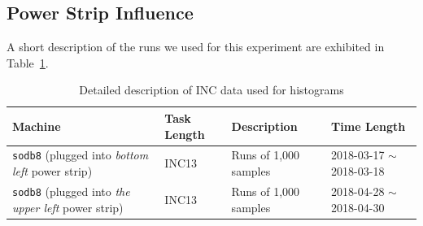 \newpage
\clearpage
\subsection{Power Strip Influence~\label{sec:sodb8}} 

A short description of the runs we used for this experiment are exhibited in Table~\ref{tab:exp_notes4}.

\begin{table}[h]
\begin{center}
\begin{tabular}{|p{4cm}|p{3cm}|p{4cm}|p{4cm}|} \hline
Machine & Task Length & Description & Time Length\\ \hline
{\tt sodb8}  (plugged into {\em bottom left} power strip) &  INC13 & Runs of 1,000 samples & 2018-03-17 $\sim$2018-03-18\\ \hline
{\tt sodb8}  (plugged into {\em the upper left} power strip) &  INC13 & Runs of 1,000 samples & 2018-04-28 $\sim$2018-04-30\\ \hline
\end{tabular}
\end{center}
\vspace{-.2in}
\caption{Detailed description of INC data used for histograms\label{tab:exp_notes4}}
\end{table}

